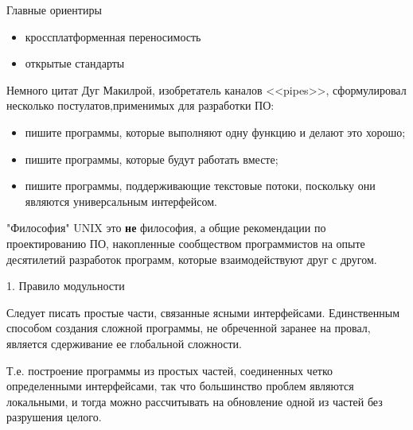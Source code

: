 

\subtitle{Принципы проектирования переносимых программ}



%
%

\begin{frame}{Главные ориентиры}
	\begin{itemize}
		\item кроссплатформенная переносимость
			\pause
		\item открытые стандарты
	\end{itemize}
\end{frame}

\begin{frame}{Немного цитат}
Дуг Макилрой, изобретатель каналов <<pipes>>, сформулировал несколько постулатов,применимых для разработки ПО:
\pause
	\begin{itemize}
		\item пишите программы,  которые выполняют одну функцию и делают это хорошо;
			\pause
		\item пишите программы,  которые будут работать вместе;
			\pause
		\item пишите программы,  поддерживающие текстовые потоки,  поскольку они являются универсальным интерфейсом.
	\end{itemize}

\end{frame}


\begin{frame}{"Философия" UNIX}
	это {\bfseries не} философия,  а общие рекомендации по проектированию ПО,  накопленные сообществом программистов на опыте десятилетий разработок программ,  которые взаимодействуют друг с другом.
\end{frame}

\begin{frame}{1. Правило модульности}
	\begin{block}{Следует писать простые части,  связанные ясными интерфейсами.}
		\pause
Единственным способом создания сложной программы,  не обреченной заранее на провал,  является сдерживание ее глобальной сложности.
	\end{block}
	\pause
Т.е. построение программы из простых частей, соединенных четко определенными интерфейсами, 
так что большинство проблем являются локальными, 
и тогда можно рассчитывать на обновление одной из частей без разрушения целого.
\end{frame}

